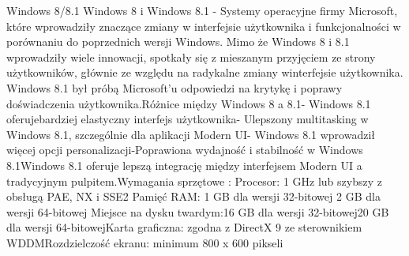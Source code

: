 \begin{frame}{Windows 8/8.1}
Windows 8 i Windows 8.1 - Systemy operacyjne firmy Microsoft, które wprowadziły znaczące zmiany w interfejsie użytkownika i funkcjonalności w porównaniu do poprzednich wersji Windows. Mimo że Windows 8 i 8.1 wprowadziły wiele innowacji, spotkały się z mieszanym przyjęciem ze strony użytkowników, głównie ze względu na radykalne zmiany winterfejsie użytkownika. Windows 8.1 był próbą Microsoft'u odpowiedzi na krytykę i poprawy doświadczenia użytkownika.Różnice między Windows 8 a 8.1- Windows 8.1 oferujebardziej elastyczny interfejs użytkownika- Ulepszony multitasking w Windows 8.1, szczególnie dla aplikacji Modern UI- Windows 8.1 wprowadził więcej opcji personalizacji-Poprawiona wydajność i stabilność w Windows 8.1Windows 8.1 oferuje lepszą integrację między interfejsem Modern UI a tradycyjnym pulpitem.Wymagania sprzętowe :   Procesor: 1 GHz lub szybszy z obsługą PAE, NX i SSE2  Pamięć RAM: 1 GB dla wersji 32-bitowej 2 GB dla wersji 64-bitowej  Miejsce na dysku twardym:16 GB dla wersji 32-bitowej20 GB dla wersji 64-bitowejKarta graficzna: zgodna z DirectX 9 ze sterownikiem WDDMRozdzielczość ekranu: minimum 800 x 600 pikseli

\end{frame}
